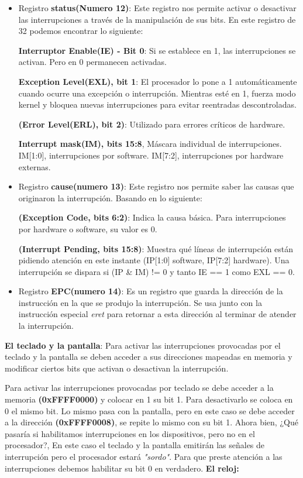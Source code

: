 \documentclass[12pt, a4paper]{article}
\begin{document}
\begin{itemize}
    \item Registro \textbf{status(Numero 12)}: Este registro nos permite activar o desactivar las interrupciones a través de la manipulación de sus bits. En este registro de 32 podemos encontrar lo siguiente:

    \textbf{Interruptor Enable(IE) - Bit 0}: Si se establece en 1, las interrupciones se activan. Pero en 0 permanecen activadas.
    
    \textbf{Exception Level(EXL), bit 1}: El procesador lo pone a 1 automáticamente cuando ocurre una excepción o interrupción. Mientras esté en 1, fuerza modo kernel y bloquea nuevas interrupciones para evitar reentradas descontroladas.
    
    \textbf{(Error Level(ERL), bit 2)}: Utilizado para errores críticos de hardware.
    
    \textbf{Interrupt mask(IM), bits 15:8}, Máscara individual de interrupciones. IM[1:0], interrupciones por software. IM[7:2], interrupciones por hardware externas.
    \item Registro \textbf{cause(numero 13)}: Este registro nos permite saber las causas que originaron la interrupción. Basando en lo siguiente:
    
    \textbf{(Exception Code, bits 6:2)}: Indica la causa básica. Para interrupciones por hardware o software, su valor es 0.

    \textbf{(Interrupt Pending, bits 15:8)}: Muestra qué líneas de interrupción están pidiendo atención en este instante (IP[1:0] software, IP[7:2] hardware). Una interrupción se dispara si (IP \& IM) != 0 y tanto IE == 1 como EXL == 0.

    \item Registro \textbf{EPC(numero 14)}: Es un registro que guarda la dirección de la instrucción en la que se produjo la interrupción. Se usa junto con la instrucción especial \textit{eret} para retornar a esta dirección al terminar de atender la interrupción.
\end{itemize}

\textbf{El teclado y la pantalla}: Para activar las interrupciones provocadas por el teclado y la pantalla se deben acceder a sus direcciones mapeadas en memoria y modificar ciertos bits que activan o desactivan la interrupción. 

Para activar las interrupciones provocadas por teclado se debe acceder a la memoria \textbf{(0xFFFF0000)} y colocar en 1 su bit 1. Para desactivarlo se coloca en 0 el mismo bit. Lo mismo pasa con la pantalla, pero en este caso se debe acceder a la dirección \textbf{(0xFFFF0008)}, se repite lo mismo con su bit 1. Ahora bien, ¿Qué pasaría si habilitamos interrupciones en los dispositivos, pero no en el procesador?, En este caso el teclado y la pantalla emitirán las señales de interrupción pero el procesador estará \textit{"sordo"}. Para que preste atención a las interrupciones debemos habilitar su bit 0 en verdadero.
\newpage
\textbf{El reloj:}
\end{document}
